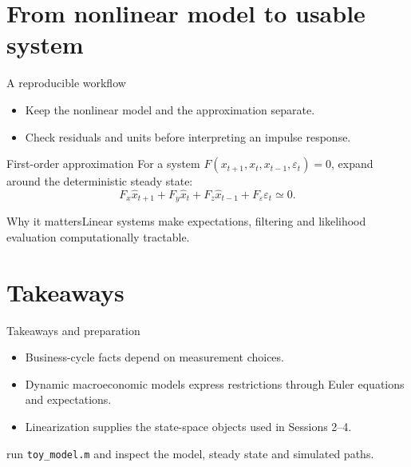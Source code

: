 \documentclass[aspectratio=169,10pt]{beamer}
\begin{document}
\section{From nonlinear model to usable system}
\begin{frame}{A reproducible workflow}
\centering{}
\vfill\begin{itemize}\item Keep the nonlinear model and the approximation separate.\item Check residuals and units before interpreting an impulse response.\end{itemize}\end{frame}
\begin{frame}{First-order approximation}
For a system \(F(x_{t+1},x_t,x_{t-1},\varepsilon_t)=0\), expand around the deterministic steady state:
\[F_x\widehat x_{t+1}+F_y\widehat x_t+F_z\widehat x_{t-1}+F_\varepsilon\varepsilon_t\simeq0.\]
\begin{block}{Why it matters}Linear systems make expectations, filtering and likelihood evaluation computationally tractable.\end{block}\end{frame}
\section{Takeaways}
\begin{frame}{Takeaways and preparation}\begin{itemize}\item Business-cycle facts depend on measurement choices.\item Dynamic macroeconomic models express restrictions through Euler equations and expectations.\item Linearization supplies the state-space objects used in Sessions 2--4.\end{itemize}\vfill{} run \texttt{toy\_model.m} and inspect the model, steady state and simulated paths.\end{frame}
\end{document}
